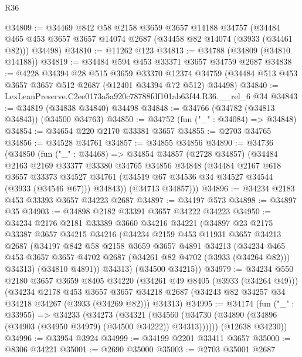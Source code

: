 \begin{lexlean}{R36}
\begin{coremodule}
@34809 := @34469
    @842
    @58
    @2158
    @3659
    @3657
    @14188
    @34757
    (@34484 @465 @453 @3657 @3657 @14074 @2687 (@34458 @82 @14074 (@3933 (@34461 @82))) @34498)
@34810 := @11262 @123
@34813 := @34788 (@34809 (@34810 @14188))
@34819 := @34484 @594 @453 @33371 @3657 @34759 @2687
@34838 := @4228
    @34394
    @28
    @515
    @3659
    @33370
    @12374
    @34759
    (@34484 @513 @453 @3657 @3657 @512 @2687 (@12401 @34394 @72 @512) @34498)
@34840 := LexLeanPreserve.C2ee0173a5a920c78788fdf101ab63f44.R36.__rel_6 @34
@34843 := @34819 (@34838 @34840) @34498
@34848 := @34766 (@34782 (@34813 @34843)) (@34500 @34763)
@34850 := @34752 (fun ("_" : @34084) => @34848)
@34854 := @34654 @220 @2170 @33381 @3657
@34855 := @2703 @34765
@34856 := @34528 @34761
@34857 := @34855 @34856
@34890 := @34736
    (@34850
      (fun ("_" : @34468) =>
      @34854
        @34857
        (@2728 @34857)
        (@34484
          @2163
          @2169
          @33377
          @33380
          @34765
          @34856
          @34848
          (@34484
            @2167
            @618
            @3657
            @33373
            @34527
            @34761
            (@34519 @67 @34536 @34 @34527 @34544 (@3933 (@34546 @67)))
            @34843))
        (@34713 @34857)))
@34896 := @34234 @2183 @453 @33393 @3657 @34223 @2687
@34897 := @34197 @573
@34898 := @34897 @35
@34903 := @34898 @2182 @33391 @3657 @34222 @34223
@34950 := @34234
    @2176
    @2181
    @33389
    @3660
    @34216
    @34221
    (@34897
      @23
      @2175
      @33387
      @3657
      @34215
      @34216
      (@34234
        @2159
        @453
        @11931
        @3657
        @34213
        @2687
        (@34197
          @842
          @58
          @2158
          @3659
          @3657
          @4891
          @34213
          (@34234 @465 @453 @3657 @3657 @4702 @2687 (@34261 @82 @4702 (@3933 (@34264 @82))) @34313)
          (@34810 @4891))
        @34313)
      (@34500 @34215))
@34979 := @34234
    @550
    @2180
    @3657
    @3659
    @8405
    @34220
    (@34261 @49 @8405 (@3933 (@34264 @49)))
    (@34234
      @2178
      @453
      @3657
      @3657
      @34218
      @2687
      (@34243 @82 @34257 @34 @34218 @34267 (@3933 (@34269 @82)))
      @34313)
@34995 := @34174
    (fun ("_" : @33955) =>
    @34233
      (@34273
        (@34321
          (@34560 (@34730 (@34890 (@34896 (@34903 (@34950 @34979) (@34500 @34222)) @34313))))))
      (@12638 @34230))
@34996 := @33954 @3924
@34999 := @34199 @2201 @33411 @3657
@35000 := @8306 @34221
@35001 := @2690 @35000
@35003 := @2703 @35001 @2687

\end{coremodule}
\end{lexlean}
